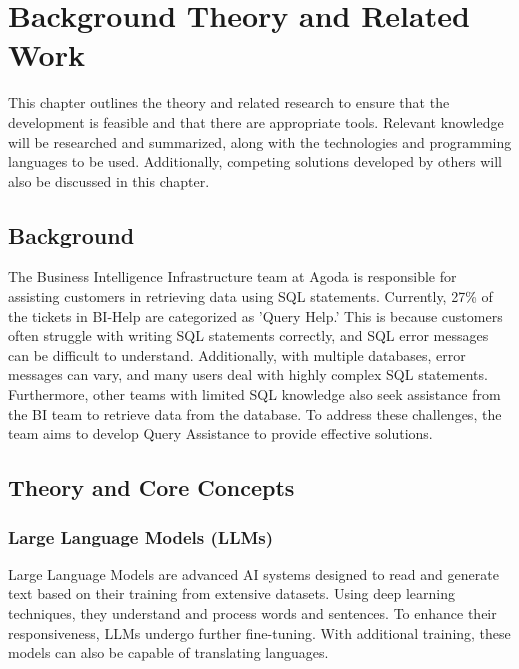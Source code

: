 \chapter{Background Theory and Related Work}






This chapter outlines the theory and related research to ensure that the development is feasible and that there are appropriate tools. Relevant knowledge will be researched and summarized, along with the technologies and programming languages to be used. Additionally, competing solutions developed by others will also be discussed in this chapter.
\section{Background}
The Business Intelligence Infrastructure team at Agoda is responsible for assisting customers in retrieving data using SQL statements. Currently, 27\% of the tickets in BI-Help are categorized as 'Query Help.' This is because customers often struggle with writing SQL statements correctly, and SQL error messages can be difficult to understand. Additionally, with multiple databases, error messages can vary, and many users deal with highly complex SQL statements. Furthermore, other teams with limited SQL knowledge also seek assistance from the BI team to retrieve data from the database. To address these challenges, the team aims to develop Query Assistance to provide effective solutions.
\section{Theory and Core Concepts}
    \subsection{Large Language Models (LLMs)}
    Large Language Models are advanced AI systems designed to read and generate text based on their training from extensive datasets. Using deep learning techniques, they understand and process words and sentences. To enhance their responsiveness, LLMs undergo further fine-tuning. With additional training, these models can also be capable of translating languages.
